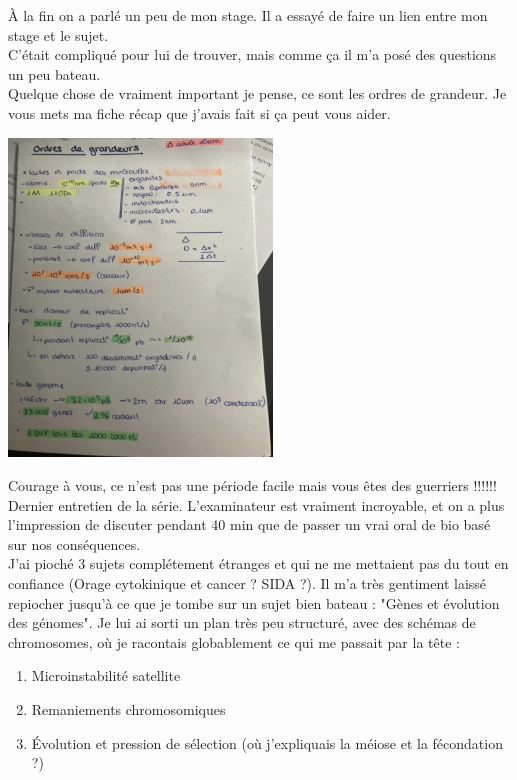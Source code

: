 À la fin on a parlé un peu de mon stage. Il a essayé de faire un lien entre mon stage et le sujet.\\
C’était compliqué pour lui de trouver, mais comme ça il m’a posé des questions un peu bateau.\\

Quelque chose de vraiment important je pense, ce sont les ordres de grandeur. Je vous mets ma fiche récap que j’avais fait si ça peut
vous aider.

\begin{center}
\includegraphics[width=7cm]{fiche.png}
\end{center}

Courage à vous, ce n’est pas une
période facile mais vous êtes des
guerriers !!!!!!\\


\lettrine{{\color{violet} \oldpilcrowfive}}{}
Dernier entretien de la série. L'examinateur est vraiment incroyable, et on a plus l'impression de discuter pendant 40 min que de passer un vrai oral de bio basé sur nos conséquences. \\
J'ai pioché 3 sujets complétement étranges et qui ne me mettaient pas du tout en confiance (Orage cytokinique et cancer ? SIDA ?). Il m'a très gentiment laissé repiocher jusqu'à ce que je tombe sur un sujet bien bateau : "Gènes et évolution des génomes". Je lui ai sorti un plan très peu structuré, avec des schémas de chromosomes, où je racontais globablement ce qui me passait par la tête :

\begin{enumerate}
\item Microinstabilité satellite
\item Remaniements chromosomiques
\item Évolution et pression de sélection (où j'expliquais la méiose et la fécondation ?)
\end{enumerate}

